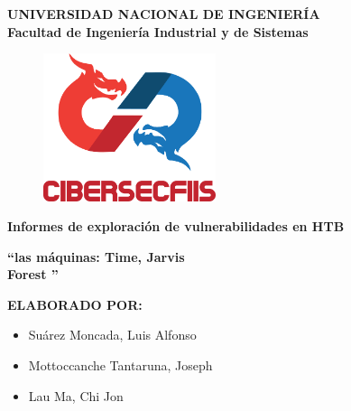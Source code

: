 \begin{titlepage}
	
	
	\begin{center}
		{\LARGE \textbf{UNIVERSIDAD NACIONAL DE INGENIERÍA}}\\
		\vspace{5 mm}
		{\large \textbf{Facultad de Ingeniería Industrial y de Sistemas}}\\
		\vspace{15.5 mm}
		\begin{figure}[h]
			\centering 
			\includegraphics[width=0.45\textwidth]{images/CiberSecFIIS.png}
		\end{figure}
		\vspace{4 mm}	
		{\Large \textbf{Informes de exploración de vulnerabilidades en HTB} }\\
		\vspace{5 mm}
		
		\onehalfspacing  %
		{\Large \textbf{``{\@De las máquinas: Time, Jarvis \\Forest }''} }\\
		
		\singlespacing  %
		
		\vspace{4 mm}	

		\vspace{20 mm}
		{\large \textbf{ELABORADO POR:} }\\
		\vspace{10 mm}
		\begin{center}
			\begin{minipage}{0.7\textwidth}
			  \begin{itemize}
				\item \Large Suárez Moncada, Luis Alfonso
				\item \Large Mottoccanche Tantaruna, Joseph
				\item \Large Lau Ma, Chi Jon
			  \end{itemize}
			\end{minipage}
		  \end{center}

		\vspace{5 mm}	
	\end{center}

\end{titlepage}
